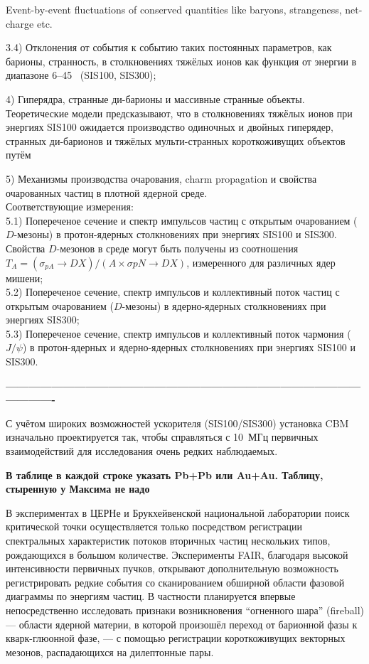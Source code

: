 \todo Event-by-event fluctuations of conserved quantities like baryons, strangeness, net-charge etc.

3.4) Отклонения от события к событию таких постоянных параметров, как барионы, странность, \todo
в столкновениях тяжёлых ионов как функция от энергии в диапазоне 6--45~\GeVperNucl{} (SIS100, SIS300);

4) Гиперядра, странные ди-барионы и массивные странные объекты. \\
Теоретические модели предсказывают, что в столкновениях тяжёлых ионов при энергиях SIS100 ожидается производство одиночных \todo и двойных \todo гиперядер, странных ди-барионов и тяжёлых мульти-странных короткоживущих объектов путём

5) Механизмы производства очарования, charm propagation и свойства очарованных частиц в плотной ядерной среде. \\
Соответствующие измерения: \\
5.1) Попереченое сечение и спектр импульсов частиц с открытым очарованием ($D$-мезоны) в протон-ядерных столкновениях при энергиях SIS100 и SIS300. Свойства $D$-мезонов в среде могут быть получены из соотношения $T_{A} = (\sigma_{pA} \rightarrow DX) / (A \times \sigma{pN} \rightarrow DX)$, измеренного для различных ядер мишени; \\
5.2) Попереченое сечение, спектр импульсов и коллективный поток частиц с открытым очарованием ($D$-мезоны) в ядерно-ядерных столкновениях при энергиях SIS300; \\
5.3) Попереченое сечение, спектр импульсов и коллективный поток чармония ($J/\psi$) в протон-ядерных и ядерно-ядерных столкновениях при энергиях SIS100 и SIS300.


\textbf{----------------------------------------------------------------------------------------------------------}


С учётом широких возможностей ускорителя (SIS100/SIS300) установка CBM изначально проектируется так, чтобы справляться с 10~МГц первичных взаимодействий для исследования очень редких наблюдаемых.

\textbf{В таблице в каждой строке указать Pb+Pb или Au+Au. Таблицу, стыренную у Максима не надо} 

В экспериментах в ЦЕРНе и Брукхейвенской национальной лаборатории поиск критической точки осуществляется только посредством регистрации спектральных характеристик потоков вторичных частиц нескольких типов, рождающихся в большом количестве. Эксперименты FAIR, благодаря высокой интенсивности первичных пучков, открывают дополнительную возможность регистрировать редкие события со сканированием обширной области фазовой диаграммы по энергиям частиц. В частности планируется впервые непосредственно исследовать признаки возникновения ``огненного шара'' (fireball) --- области ядерной материи, в которой произошёл переход от барионной фазы к кварк-глюонной фазе, --- с помощью регистрации короткоживущих векторных мезонов, распадающихся на дилептонные пары.

